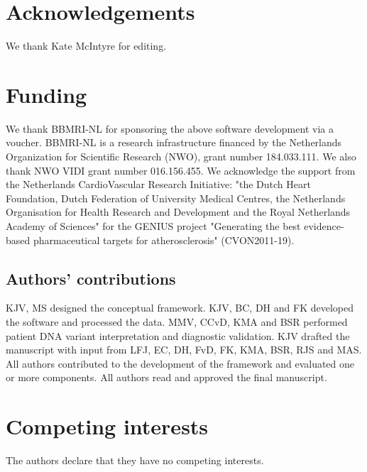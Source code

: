\section*{Acknowledgements}
We thank Kate McIntyre for editing.

\section*{Funding}
We thank BBMRI-NL for sponsoring the above software development via a voucher.
BBMRI-NL is a research infrastructure financed by the Netherlands Organization for Scientific Research (NWO), grant number 184.033.111.
We also thank NWO VIDI grant number 016.156.455.
We acknowledge the support from the Netherlands CardioVascular Research Initiative: "the Dutch Heart Foundation, Dutch Federation of University Medical Centres, the Netherlands Organisation for Health Research and Development and the Royal Netherlands Academy of Sciences" for the GENIUS project "Generating the best evidence-based pharmaceutical targets for atherosclerosis" (CVON2011-19).

\subsection*{Authors' contributions}
KJV, MS designed the conceptual framework.
KJV, BC, DH and FK developed the software and processed the data.
MMV, CCvD, KMA and BSR performed patient DNA variant interpretation and diagnostic validation.
KJV drafted the manuscript with input from LFJ, EC, DH, FvD, FK, KMA, BSR, RJS and MAS.
All authors contributed to the development of the framework and evaluated one or more components.
All authors read and approved the final manuscript.

\section*{Competing interests}
The authors declare that they have no competing interests.
